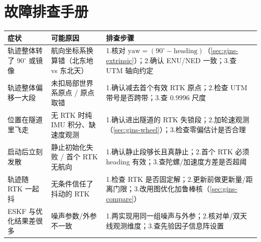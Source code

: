 \section*{故障排查手册}
\begin{table}[H]\centering\small
\begin{tabular}{p{} p{} p{}}
\toprule
症状 & 可能原因 & 排查步骤 \\
\midrule
轨迹整体转了 $90^\circ$ 或镜像 & 航向坐标系换算错（北东地 vs 东北天） & 1.核对 $\text{yaw}=(90^\circ-\text{heading})$（\cref{sec:gins-extrinsic}）；2.确认 ENU/NED 一致；3.查 UTM 轴向约定 \\
轨迹整体偏移一大段 & 未扣局部世界系原点 / 原点取错 & 1.确认减去首个有效 RTK 原点；2.检查 UTM 带号是否跨带；3.查 $0.9996$ 尺度 \\
位置在隧道里飞走 & 无 RTK 时纯 IMU 积分、缺速度观测 & 1.确认进出隧道的 RTK 失锁段；2.加轮速观测（\cref{sec:gins-wheel}）；3.检查零偏估计是否合理 \\
启动后立刻发散 & 静止初始化失败 / 首个 RTK 无航向 & 1.确认静止段够长且真静止；2.首个 RTK 必须 heading 有效；3.查陀螺/加速度方差是否超阈 \\
轨迹随 RTK 一起抖 & 无条件信任了抖动的 RTK & 1.检查 RTK 是否固定解；2.更新前做更新量/距离门限；3.改用图优化加鲁棒核（\cref{sec:gins-compare}） \\
ESKF 与优化结果差很多 & 噪声参数/外参不一致 & 1.两实现用同一组噪声与外参；2.核对单/双天线观测维度；3.查先验因子信息阵设置 \\
\bottomrule
\end{tabular}
\end{table}

